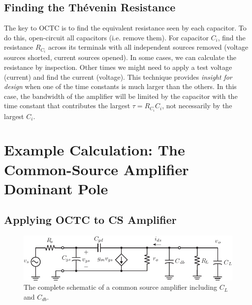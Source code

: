 \subsection{Finding the Thévenin Resistance}
The key to OCTC is to find the equivalent resistance seen by each capacitor.  To do this, open-circuit all capacitors (i.e. remove them).  For capacitor $C_i$, find the resistance $R_{C_i}$ across its terminals with all independent sources removed (voltage sources shorted, current sources opened).  In some cases, we can calculate the resistance by inspection. Other times we might need to apply a test voltage (current) and find the current (voltage).  This technique provides \textit{insight for design} when one of the time constants is much larger than the others.  In this case, the bandwidth of the amplifier will be limited by the capacitor with the time constant that contributes the largest $\tau = R_{C_i} C_i$, not necessarily by the largest $C_i$.
\section{Example Calculation:  The Common-Source Amplifier Dominant Pole}
\subsection{Applying OCTC to CS Amplifier}
\begin{figure}[tb]
\begin{center}
\includegraphics[scale=1]{cs_amp_ac_caps}
\end{center}
\caption{The complete schematic of a common source amplifier including $C_L$ and $C_{db}$.} \label{fig:cs_amp_ac_caps2}
\end{figure}

